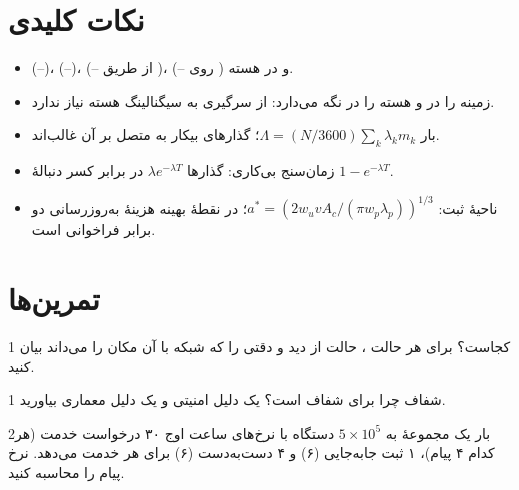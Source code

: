 \documentclass[11pt,a4paper]{article}
\begin{document}
\section{نکات کلیدی}
\begin{takeawaybox}
\begin{itemize}
  \item {} (--)،  (--)،  (-- از طریق )،  (--
        روی ) و  در هسته.
  \item {} زمینه را در  و هسته را در  نگه می‌دارد: از سرگیری به سیگنالینگ هسته نیاز ندارد.
  \item بار $\Lambda = (N/3600)\sum_k \lambda_k m_k$؛ گذارهای بیکار به متصل بر آن غالب‌اند.
  \item زمان‌سنج بی‌کاری: گذارها $\lambda e^{-\lambda T}$ در برابر کسر دنبالهٔ $1 - e^{-\lambda T}$.
  \item ناحیهٔ ثبت: $a^{*} = (2w_u v A_c/(\pi w_p\lambda_p))^{1/3}$؛ در نقطهٔ بهینه هزینهٔ به‌روزرسانی دو برابر فراخوانی است.
\end{itemize}
\end{takeawaybox}

\section{تمرین‌ها}

\begin{exercisebox}{1}{ کجاست؟}\label{exr:states}
برای هر حالت ، حالت  از دید  و دقتی را که شبکه با آن مکان  را می‌داند بیان کنید.
\end{exercisebox}

\begin{exercisebox}{1}{ شفاف}\label{exr:nas}
چرا  برای  شفاف است؟ یک دلیل امنیتی و یک دلیل معماری بیاورید.
\end{exercisebox}

\begin{exercisebox}{2}{بار }\label{exr:load}
یک مجموعهٔ  به $5\times10^{5}$ دستگاه  با نرخ‌های ساعت اوج ۳۰ درخواست خدمت (هر کدام ۴ پیام)، ۱ ثبت جابه‌جایی (۶) و ۴ دست‌به‌دست (۶) برای هر
 خدمت می‌دهد. نرخ پیام را محاسبه کنید.
\end{exercisebox}
\end{document}
